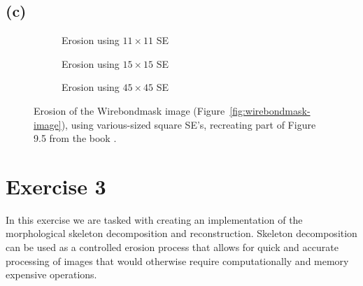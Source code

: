 \documentclass{article}
\begin{document}
\subsection*{(c)}
\begin{figure}[H]
     \centering
     \begin{subfigure}[b]{0.3\textwidth}
         \centering
         
         \caption{Erosion using $11 \times 11$ SE}
         \label{fig:book9.5figure-wirebondmask-image-11x11}
     \end{subfigure}
     \hfill
     \begin{subfigure}[b]{0.3\textwidth}
         \centering
         
         \caption{Erosion using $15 \times 15$ SE}
         \label{fig:book9.5figure-wirebondmask-image-15x15}
     \end{subfigure}
     \hfill
     \begin{subfigure}[b]{0.3\textwidth}
         \centering
         
         \caption{Erosion using $45 \times 45$ SE}
         \label{fig:book9.5figure-wirebondmask-image-45x45}
     \end{subfigure}
     
    \caption{Erosion of the Wirebondmask image (Figure~\ref{fig:wirebondmask-image}), using various-sized square SE's, recreating part of Figure 9.5 from the book \citep{gonzalez2008digital}.}
    \label{fig:book9.5figure}
\end{figure}


\section*{Exercise 3}
In this exercise we are tasked with creating an implementation of the morphological skeleton decomposition and reconstruction. Skeleton decomposition can be used as a controlled erosion process that allows for quick and accurate processing of images that would otherwise require computationally and memory expensive operations.
\end{document}
